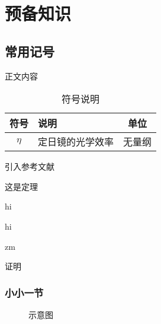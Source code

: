 \documentclass[UTF8,heading=true,12pt,font=songti]{article}
\begin{document}
	\section{预备知识}
	\subsection{常用记号}
	正文内容
	\begin{table}[H]
		\centering\small
		\renewcommand{\arraystretch}{1.5} %
		\caption{符号说明}
		\begin{tabular}{clc} %
			\hline
			\textbf{符号} & \textbf{说明} & \textbf{单位} \\ \hline
			$\eta$ & 定日镜的光学效率 & 无量纲\\
			\hline
		\end{tabular}
	\end{table}  
	引入参考文献 \cite{bazlov2024momentsrepresentationnumbers}
	\begin{theorem}[thm]
		这是定理
	\end{theorem}
	\begin{lemma}
		hi
	\end{lemma}
	\begin{definition}
		hi
	\end{definition}
	\qu zm
	
	\pf 证明
	
	\subsubsection{小小一节}
	\begin{figure}[H]
		\centering
		\hfill
		\hfill
		\hfill
		\caption{示意图}
		\label{fig:label2}
	\end{figure}  
	
	
	
	
\end{document}
